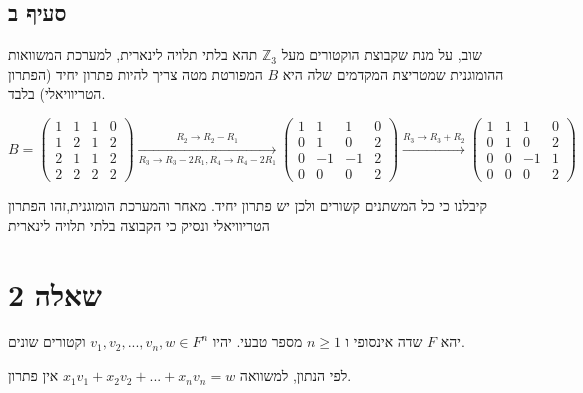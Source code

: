 \documentclass{article}
\begin{document}
\subsection*{סעיף ב}

שוב, על מנת שקבוצת הוקטורים מעל $\mathbb{Z}_3$ תהא בלתי תלויה לינארית, למערכת המשוואות ההומוגנית שמטריצת המקדמים שלה היא $B$ המפורטת מטה צריך להיות פתרון יחיד (הפתרון הטריוויאלי) בלבד.

\[
    B = \begin{pmatrix}
        1 & 1 & 1 & 0 \\
        1 & 2 & 1 & 2 \\
        2 & 1 & 1 & 2 \\
        2 & 2 & 2 & 2
    \end{pmatrix}
    \xrightarrow[R_3\rightarrow R_3-2R_1, R_4\rightarrow R_4-2R_1]{R_2\rightarrow R_2-R_1}
    \begin{pmatrix}
        1 & 1  & 1  & 0 \\
        0 & 1  & 0  & 2 \\
        0 & -1 & -1 & 2 \\
        0 & 0  & 0  & 2
    \end{pmatrix}
    \xrightarrow{R_3\rightarrow R_3+R_2}
    \begin{pmatrix}
        1 & 1 & 1  & 0 \\
        0 & 1 & 0  & 2 \\
        0 & 0 & -1 & 1 \\
        0 & 0 & 0  & 2
    \end{pmatrix}
\]

קיבלנו כי כל המשתנים קשורים ולכן יש פתרון יחיד. מאחר והמערכת הומוגנית,זהו הפתרון הטריוויאלי ונסיק כי הקבוצה בלתי תלויה לינארית

\section*{שאלה 2}

יהא $F$
שדה אינסופי ו
$n\geq 1$
מספר טבעי.
יהיו
$v_1, v_2, ..., v_n, w\in F^n$
וקטורים שונים.

לפי הנתון, למשוואה
$x_1v_1+x_2v_2+...+x_nv_n=w$
אין פתרון.
\end{document}
